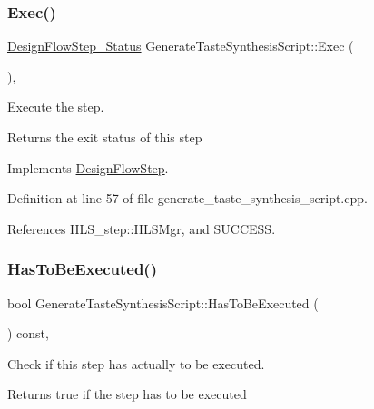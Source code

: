 \subsubsection{\texorpdfstring{Exec()}{Exec()}}
{\footnotesize\ttfamily \hyperlink{design__flow__step_8hpp_afb1f0d73069c26076b8d31dbc8ebecdf}{Design\+Flow\+Step\+\_\+\+Status} Generate\+Taste\+Synthesis\+Script\+::\+Exec (\begin{DoxyParamCaption}{ }\end{DoxyParamCaption})\hspace{0.3cm}{\ttfamily [override]}, {\ttfamily [virtual]}}



Execute the step. 

\begin{DoxyReturn}{Returns}
the exit status of this step 
\end{DoxyReturn}


Implements \hyperlink{classDesignFlowStep_a77d7e38493016766098711ea24f60b89}{Design\+Flow\+Step}.



Definition at line 57 of file generate\+\_\+taste\+\_\+synthesis\+\_\+script.\+cpp.



References H\+L\+S\+\_\+step\+::\+H\+L\+S\+Mgr, and S\+U\+C\+C\+E\+SS.

\mbox{\label{classGenerateTasteSynthesisScript_acbd9a6934e6ba26615b49dc66650981f}} 
\subsubsection{\texorpdfstring{Has\+To\+Be\+Executed()}{HasToBeExecuted()}}
{\footnotesize\ttfamily bool Generate\+Taste\+Synthesis\+Script\+::\+Has\+To\+Be\+Executed (\begin{DoxyParamCaption}{ }\end{DoxyParamCaption}) const\hspace{0.3cm}{\ttfamily [override]}, {\ttfamily [virtual]}}



Check if this step has actually to be executed. 

\begin{DoxyReturn}{Returns}
true if the step has to be executed 
\end{DoxyReturn}


